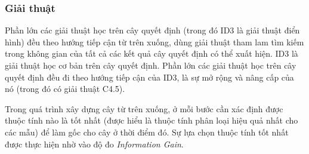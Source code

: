 \documentclass[12pt]{extarticle}
\begin{document}
			\subsubsection*{Giải thuật}		
				\par Phần lớn các giải thuật học trên cây quyết định (trong đó ID3 là giải thuật điển hình) đều theo hướng tiếp cận từ trên xuống, dùng giải thuật tham lam tìm kiếm trong không gian của tất cả các kết quả cây quyết định có thể xuất hiện. ID3 là giải thuật học cơ bản trên cây quyết định. Phần lớn các giải thuật học trên cây quyết định đều đi theo hướng tiếp cận của ID3, là sự mở rộng và nâng cấp của nó (trong đó có giải thuật C4.5).			
				\par Trong quá trình xây dựng cây từ trên xuống, ở mỗi bước cần xác định được thuộc tính nào là tốt nhất (được hiểu là thuộc tính phân loại hiệu quả nhất cho các mẫu) để làm gốc cho cây ở thời điểm đó. Sự lựa chọn thuộc tính tốt nhất được thực hiện nhờ vào độ đo \textit{Information Gain}.
\end{document}
